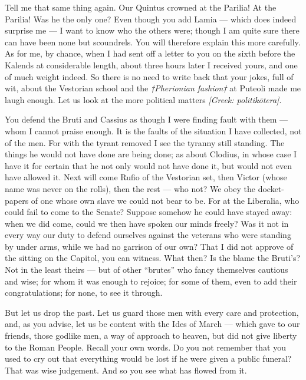 

 Tell me that same thing again. Our Quintus crowned at the Parilia! At the Parilia! Was he the only one? Even though you add Lamia --- which does indeed surprise me --- I want to know who the others were; though I am quite sure there can have been none but scoundrels. You will therefore explain this more carefully. As for me, by chance, when I had sent off a letter to you on the sixth before the Kalends at considerable length, about three hours later I received yours, and one of much weight indeed. So there is no need to write back that your jokes, full of wit, about the Vestorian school and the \textit{†Pherionian fashion†} at Puteoli made me laugh enough. Let us look at the more political matters \textit{[Greek: politik\=otera]}.

 You defend the Bruti and Cassius as though I were finding fault with them --- whom I cannot praise enough. It is the faults of the situation I have collected, not of the men. For with the tyrant removed I see the tyranny still standing. The things he would not have done are being done; as about Clodius, in whose case I have it for certain that he not only would not have done it, but would not even have allowed it. Next will come Rufio of the Vestorian set, then Victor (whose name was never on the rolls), then the rest --- who not? We obey the docket-papers of one whose own slave we could not bear to be. For at the Liberalia, who could fail to come to the Senate? Suppose somehow he could have stayed away: when we did come, could we then have spoken our minds freely? Was it not in every way our duty to defend ourselves against the veterans who were standing by under arms, while we had no garrison of our own? That I did not approve of the sitting on the Capitol, you can witness. What then? Is the blame the Bruti's? Not in the least theirs --- but of other ``brutes'' who fancy themselves cautious and wise; for whom it was enough to rejoice; for some of them, even to add their congratulations; for none, to see it through.

 But let us drop the past. Let us guard those men with every care and protection, and, as you advise, let us be content with the Ides of March --- which gave to our friends, those godlike men, a way of approach to heaven, but did not give liberty to the Roman People. Recall your own words. Do you not remember that you used to cry out that everything would be lost if he were given a public funeral? That was wise judgement. And so you see what has flowed from it.

